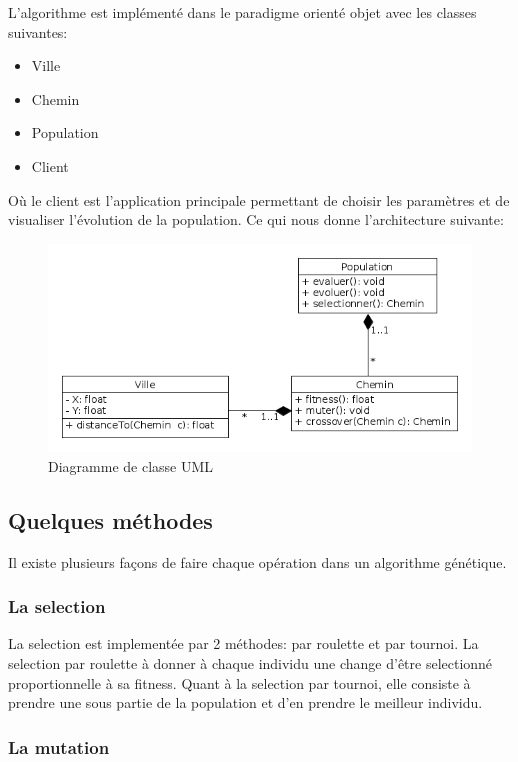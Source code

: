 \documentclass[11pt]{article}
\begin{document}
L'algorithme est implémenté dans le paradigme orienté objet avec les classes suivantes:
\begin{itemize}
\item Ville
\item Chemin
\item Population
\item Client
\end{itemize}

Où le client est l'application principale permettant de choisir les paramètres et de visualiser l'évolution de la population.
Ce qui nous donne l'architecture suivante:

\begin{figure}[htb]
\centering
\includegraphics[width=.9\linewidth]{./UML_Class.png}
\caption{Diagramme de classe UML}
\end{figure}

\subsection{Quelques méthodes}
\label{sec-2-2}

Il existe plusieurs façons de faire chaque opération dans un algorithme génétique.

\subsubsection{La selection}
\label{sec-2-2-1}

La selection est implementée par 2 méthodes: par roulette et par tournoi. La selection par
roulette à donner à chaque individu une change d'être selectionné proportionnelle à sa
fitness. Quant à la selection par tournoi, elle consiste à prendre une sous partie
de la population et d'en prendre le meilleur individu.

\subsubsection{La mutation}
\label{sec-2-2-2}
\end{document}
